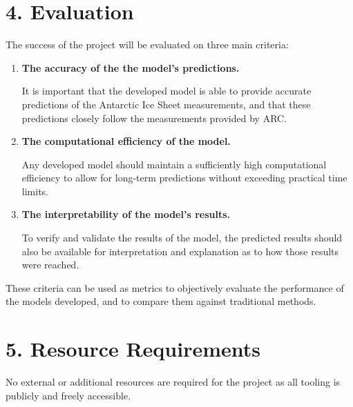 \documentclass[11pt, a4paper, twoside, openright]{report}
\begin{document}
\section*{4. Evaluation}

The success of the project will be evaluated on three main
criteria:
\begin{enumerate}
\item \textbf{The accuracy of the the model's predictions.}
  
  It is important that the developed model is able to
  provide accurate predictions of the Antarctic Ice Sheet
  measurements, and that these predictions closely follow
  the measurements provided by ARC.
\item \textbf{The computational efficiency of the model.}

  Any developed model should maintain a sufficiently high
  computational efficiency to allow for long-term predictions
  without exceeding practical time limits.
\item \textbf{The interpretability of the model's results.}

  To verify and validate the results of the model, the 
  predicted results should also be available for 
  interpretation and explanation as to how those results
  were reached.
\end{enumerate}
These criteria can be used as metrics to objectively
evaluate the performance of the models developed, and
to compare them against traditional methods.

\section*{5. Resource Requirements}

No external or additional resources are required for the
project as all tooling is publicly and freely accessible.

\backmatter

%


\end{document}
